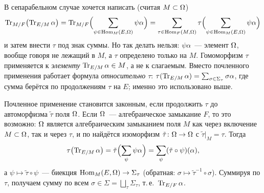 \begin{aside}
В сепарабельном случае хочется написать (считая $M\subset\Omega$)
\[
\operatorname{Tr}_{M/F}\bigl(\operatorname{Tr}_{E/M}\alpha\bigr)=\operatorname{Tr}_{M/F}\Bigl(\sum_{\psi\in\operatorname{Hom}_M(E,\Omega)}\psi\alpha\Bigr)
=\sum_{\tau\in\operatorname{Hom}_F(M,\Omega)}\tau\Bigl(\sum_{\psi\in\operatorname{Hom}_M(E,\Omega)}\psi\alpha\Bigr)
\]
и затем внести $\tau$ под знак суммы. Но так делать нельзя: $\psi\alpha$~--- элемент $\Omega$, вообще говоря не лежащий в
$M$, а $\tau$ определено только на $M$. Гомоморфизм $\tau$ применяется к \emph{элементу} $\operatorname{Tr}_{E/M}\alpha\in M$, а не к
слагаемым. Вместо почленного применения работает формула  \emph{относительно $\tau$}:
$\tau(\operatorname{Tr}_{E/M}\alpha)=\sum_{\sigma\in\Sigma_\tau}\sigma\alpha$, где сумма берётся по продолжениям $\tau$ на $E$; именно
это использовано выше.

Почленное применение становится законным, если продолжить $\tau$ до автоморфизма $\tilde\tau$ поля $\Omega$. Если $\Omega$~---
алгебраическое замыкание $F$, то это возможно: $\Omega$ является алгебраическим замыканием поля $M$ как через включение
$M\subset\Omega$, так и через $\tau$, и по  найдётся изоморфизм $\tilde\tau\colon\Omega\to\Omega$ с $\tilde\tau|_M=\tau$. Тогда
\[
\tau\bigl(\operatorname{Tr}_{E/M}\alpha\bigr)=\tilde\tau\Bigl(\sum_{\psi}\psi\alpha\Bigr)=\sum_{\psi}(\tilde\tau\circ\psi)(\alpha),
\]
а $\psi\mapsto\tilde\tau\circ\psi$~--- биекция $\operatorname{Hom}_M(E,\Omega)\to\Sigma_\tau$ (обратная: $\sigma\mapsto\tilde\tau^{-1}\circ\sigma$).
Суммируя по $\tau$, получаем сумму по всем $\sigma\in\Sigma=\bigsqcup_\tau\Sigma_\tau$, т.\,е.\ $\operatorname{Tr}_{E/F}\alpha$.
\end{aside}

